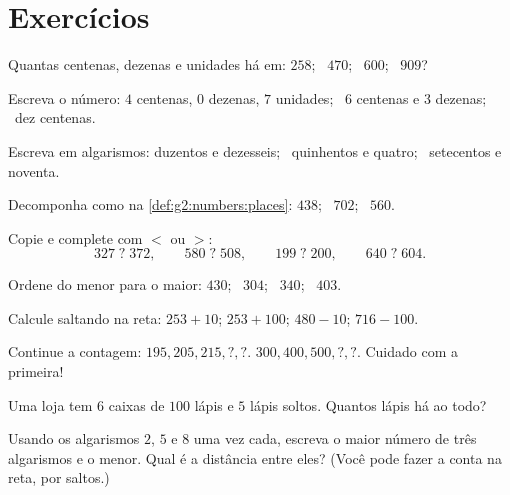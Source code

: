 \section{Exercícios}

\begin{exercise}[$\star$]\label{exo:g2:numbers:1}
Quantas centenas, dezenas e unidades há em: $258$; \ $470$; \
$600$; \ $909$?
\end{exercise}

\begin{exercise}[$\star$]\label{exo:g2:numbers:2}
Escreva o número: $4$ centenas, $0$ dezenas, $7$ unidades; \ $6$
centenas e $3$ dezenas; \ dez centenas.
\end{exercise}

\begin{exercise}[$\star$]\label{exo:g2:numbers:3}
Escreva em algarismos: duzentos e dezesseis; \ quinhentos e quatro;
\ setecentos e noventa.
\end{exercise}

\begin{exercise}[$\star$]\label{exo:g2:numbers:4}
Decomponha como na \cref{def:g2:numbers:places}: $438$; \ $702$; \
$560$.
\end{exercise}

\begin{exercise}[$\star$]\label{exo:g2:numbers:5}
Copie e complete com $<$ ou $>$:
\[
327 \;?\; 372, \qquad
580 \;?\; 508, \qquad
199 \;?\; 200, \qquad
640 \;?\; 604 .
\]
\end{exercise}

\begin{exercise}[$\star$]\label{exo:g2:numbers:6}
Ordene do menor para o maior: $430$; \ $304$; \ $340$; \ $403$.
\end{exercise}

\begin{exercise}[$\star$]\label{exo:g2:numbers:7}
Calcule saltando na reta: $253 + 10$; \quad $253 + 100$;
\quad $480 - 10$; \quad $716 - 100$.
\end{exercise}

\begin{exercise}[$\star$]\label{exo:g2:numbers:8}
Continue a contagem: $195, 205, 215, ?, ?$. \quad
$300, 400, 500, ?, ?$. \quad Cuidado com a primeira!
\end{exercise}

\begin{exercise}[$\star$]\label{exo:g2:numbers:9}
Uma loja tem $6$ caixas de $100$ lápis e $5$ lápis soltos. Quantos
lápis há ao todo?
\end{exercise}

\begin{exercise}[$\star\star$]\label{exo:g2:numbers:10}
Usando os algarismos $2$, $5$ e $8$ uma vez cada, escreva o maior
número de três algarismos e o menor. Qual é a distância entre eles?
(Você pode fazer a conta na reta, por saltos.)
\end{exercise}
